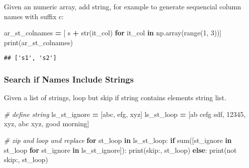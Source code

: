 \documentclass[
]{book}
\newenvironment{Shaded}{\begin{snugshade}}{\end{snugshade}}
\newcommand{\BuiltInTok}[1]{#1}
\newcommand{\CommentTok}[1]{\textcolor[rgb]{0.56,0.35,0.01}{\textit{#1}}}
\newcommand{\ControlFlowTok}[1]{\textcolor[rgb]{0.13,0.29,0.53}{\textbf{#1}}}
\newcommand{\DecValTok}[1]{\textcolor[rgb]{0.00,0.00,0.81}{#1}}
\newcommand{\KeywordTok}[1]{\textcolor[rgb]{0.13,0.29,0.53}{\textbf{#1}}}
\newcommand{\NormalTok}[1]{#1}
\newcommand{\OperatorTok}[1]{\textcolor[rgb]{0.81,0.36,0.00}{\textbf{#1}}}
\newcommand{\StringTok}[1]{\textcolor[rgb]{0.31,0.60,0.02}{#1}}
\begin{document}
Given an numeric array, add string, for example to generate sequencial column names with suffix c:

\begin{Shaded}
\begin{Highlighting}[]
\NormalTok{ar\_st\_colnames }\OperatorTok{=}\NormalTok{ [ }\StringTok{\textquotesingle{}s\textquotesingle{}} \OperatorTok{+} \BuiltInTok{str}\NormalTok{(it\_col) }\ControlFlowTok{for}\NormalTok{ it\_col }\KeywordTok{in}\NormalTok{ np.array(}\BuiltInTok{range}\NormalTok{(}\DecValTok{1}\NormalTok{, }\DecValTok{3}\NormalTok{))]}
\BuiltInTok{print}\NormalTok{(ar\_st\_colnames)}
\end{Highlighting}
\end{Shaded}

\begin{verbatim}
## ['s1', 's2']
\end{verbatim}

\hypertarget{search-if-names-include-strings}{%
\subsubsection{Search if Names Include Strings}\label{search-if-names-include-strings}}

Given a list of strings, loop but skip if string contains elements string list.

\begin{Shaded}
\begin{Highlighting}[]
\CommentTok{\# define string}
\NormalTok{ls\_st\_ignore }\OperatorTok{=}\NormalTok{ [}\StringTok{\textquotesingle{}abc\textquotesingle{}}\NormalTok{, }\StringTok{\textquotesingle{}efg\textquotesingle{}}\NormalTok{, }\StringTok{\textquotesingle{}xyz\textquotesingle{}}\NormalTok{]}
\NormalTok{ls\_st\_loop }\OperatorTok{=}\NormalTok{ [}\StringTok{\textquotesingle{}ab cefg sdf\textquotesingle{}}\NormalTok{, }\StringTok{\textquotesingle{}12345\textquotesingle{}}\NormalTok{, }\StringTok{\textquotesingle{}xyz\textquotesingle{}}\NormalTok{, }\StringTok{\textquotesingle{}abc xyz\textquotesingle{}}\NormalTok{, }\StringTok{\textquotesingle{}good morning\textquotesingle{}}\NormalTok{]}

\CommentTok{\# zip and loop and replace}
\ControlFlowTok{for}\NormalTok{ st\_loop }\KeywordTok{in}\NormalTok{ ls\_st\_loop:}
  \ControlFlowTok{if} \BuiltInTok{sum}\NormalTok{([st\_ignore }\KeywordTok{in}\NormalTok{ st\_loop }\ControlFlowTok{for}\NormalTok{ st\_ignore }\KeywordTok{in}\NormalTok{ ls\_st\_ignore]):}
    \BuiltInTok{print}\NormalTok{(}\StringTok{\textquotesingle{}skip:\textquotesingle{}}\NormalTok{, st\_loop)}
  \ControlFlowTok{else}\NormalTok{:}
    \BuiltInTok{print}\NormalTok{(}\StringTok{\textquotesingle{}not skip:\textquotesingle{}}\NormalTok{, st\_loop)}
\end{Highlighting}
\end{Shaded}
\end{document}
